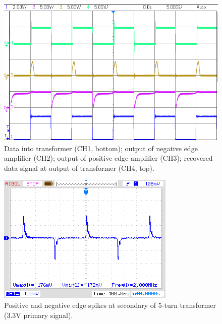 \documentclass[conference]{IEEEtran}
\begin{document}
	\begin{figure}[t]
		\centering
		\includegraphics[width=0.8\columnwidth]{./img/DataCropped}
		\caption{Data into transformer (CH1, bottom); output of negative edge amplifier (CH2); output of positive edge amplifier (CH3); recovered data signal at output of transformer (CH4, top).}
		\label{fig:Data}
	\end{figure}

	\begin{figure}[t]
		\centering
		\includegraphics[width=0.8\columnwidth]{./img/5turnTF}
		\caption{Positive and negative edge spikes at secondary of 5-turn transformer (3.3V primary signal).}
		\label{fig:5turnTF}
	\end{figure}
\end{document}
